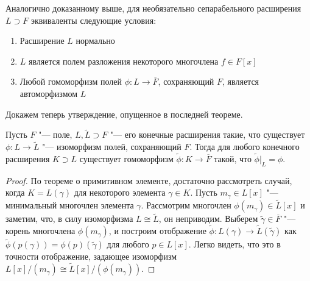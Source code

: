 \begin{note}
	Аналогично доказанному выше, для необязательно сепарабельного расширения $L \supset F$ эквиваленты следующие условия:
	\begin{enumerate}
		\item Расширение $L$ нормально
		\item $L$ является полем разложения некоторого многочлена $f \in F[x]$
		\item Любой гомоморфизм полей $\phi: L \to \overline{F}$, сохраняющий $F$, является автоморфизмом $L$
	\end{enumerate}
\end{note}

Докажем теперь утверждение, опущенное в последней теореме.

\begin{proposition}
	Пусть $F$ "--- поле, $L, \widetilde{L} \supset F$ "--- его конечные расширения такие, что существует $\phi: L \to \widetilde{L}$ "--- изоморфизм полей, сохраняющий $F$. Тогда для любого конечного расширения $K \supset L$ существует гомоморфизм $\widetilde{\phi}: K \to \overline{F}$ такой, что $\widetilde\phi|_{L} = \phi$.
\end{proposition}

\begin{proof}
	По теореме о примитивном элементе, достаточно рассмотреть случай, когда $K = L(\gamma)$ для некоторого элемента $\gamma \in K$. Пусть $m_\gamma \in L[x]$ "--- минимальный многочлен элемента $\gamma$. Рассмотрим многочлен $\phi(m_\gamma) \in \widetilde{L}[x]$ и заметим, что, в силу изоморфизма $L \cong \widetilde{L}$, он неприводим. Выберем $\widetilde{\gamma} \in \overline{F}$ "--- корень многочлена $\phi(m_\gamma)$, и построим отображение $\widetilde{\phi}: L(\gamma) \to \widetilde L(\widetilde{\gamma})$ как $\widetilde{\phi}(p(\gamma)) = \phi(p)(\widetilde{\gamma})$ для любого $p \in L[x]$. Легко видеть, что это в точности отображение, задающее изоморфизм $L[x] / (m_\gamma) \cong \widetilde L[x] / (\phi(m_\gamma))$.
\end{proof}